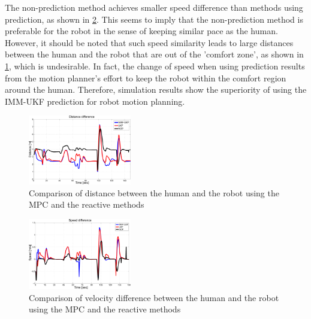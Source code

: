 \documentclass[journal]{IEEEtran}
\begin{document}
	The non-prediction method achieves smaller speed difference than methods using prediction, as shown in \cref{fig:err_v}.
	This seems to imply that the non-prediction method is preferable for the robot in the sense of keeping similar pace as the human.
	However, it should be noted that such speed similarity leads to large distances between the human and the robot that are out of the 'comfort zone', as shown in \cref{fig:err_d}, which is undesirable.
	In fact, the change of speed when using prediction results from the motion planner's effort to keep the robot within the comfort region around the human.
	Therefore, simulation results show the superiority of using the IMM-UKF prediction for robot motion planning.
	\begin{figure}
		\centering
		\includegraphics[width=0.4\textwidth]{figures/dis_diff2.pdf}
		\caption{Comparison of distance between the human and the robot using the MPC and the reactive methods}
		\label{fig:err_d}
	\end{figure}
	
	\begin{figure}
		\centering
		\includegraphics[width=0.4\textwidth]{figures/vel_diff2.pdf}
		\caption{Comparison of velocity difference between the human and the robot using the MPC and the reactive methods}
		\label{fig:err_v}
	\end{figure}
	
\end{document}
